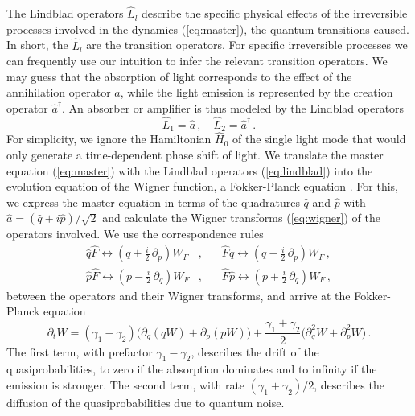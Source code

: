 \documentclass[12pt,amsmath,amssymb]{article}
\numberwithin{equation}{section}
\begin{document}
The Lindblad operators $\hat{L}_l$ describe the specific physical
effects of the irreversible processes involved in the dynamics
(\ref{eq:master}), the quantum transitions caused.
In short, the $\hat{L}_l$ are the transition operators.
For specific irreversible processes we can frequently use
our intuition to infer the relevant transition operators.
We may guess that the absorption of light corresponds
to the effect of the annihilation operator $\hat{a}$,
while the light emission
is represented by the creation operator $\hat{a}^\dagger$.
An absorber or amplifier is thus modeled by the
Lindblad operators
\begin{equation}
\label{eq:lindblad} \hat{L}_1 = \hat{a} \,,\quad  \hat{L}_2 =
\hat{a}^\dagger \,.
\end{equation}
For simplicity, we ignore the Hamiltonian $\hat{H}_0$ of the
single light mode that would only generate a time-dependent phase
shift of light. We translate the master equation
(\ref{eq:master}) with the Lindblad operators (\ref{eq:lindblad})
into the evolution equation of the Wigner function, a
Fokker-Planck equation
\cite{Carmichael,Gardiner,GardinerZoller,Risken}. For this, we
express the master equation in terms of the quadratures $\hat{q}$
and $\hat{p}$ with $\hat{a}=(\hat{q}+i\hat{p})/\sqrt{2}$ and
calculate the Wigner transforms (\ref{eq:wigner}) of the
operators involved. We use the correspondence rules
\cite{Gardiner}
\begin{eqnarray}
\hat{q}\hat{F}\longleftrightarrow
\left(q+\frac{i}{2}\,\partial_p\right)W_F&,&\quad
\hat{F}\hat{q}\longleftrightarrow
\left(q-\frac{i}{2}\,\partial_p\right)W_F\,, \nonumber\\
\hat{p}\hat{F}\longleftrightarrow
\left(p-\frac{i}{2}\,\partial_q\right)W_F&,&\quad
\hat{F}\hat{p}\longleftrightarrow
\left(p+\frac{i}{2}\,\partial_q\right)W_F\,,
\end{eqnarray}
between the operators and their Wigner transforms, and arrive at
the Fokker-Planck equation
\begin{equation}
\label{eq:fokker} \partial_t W = (\gamma_1-\gamma_2)
\big(\partial_q(qW)+\partial_p(pW)\big) +
\frac{\gamma_1+\gamma_2}{2} \big(\partial_q^2W+\partial_p^2W\big)
\,.
\end{equation}
The first term, with prefactor $\gamma_1-\gamma_2$, describes the
drift of the quasiprobabilities, to zero if the absorption
dominates and to infinity if the emission is stronger. The second
term, with rate $(\gamma_1+\gamma_2)/2$, describes the diffusion
of the quasiprobabilities due to quantum noise.
\end{document}
